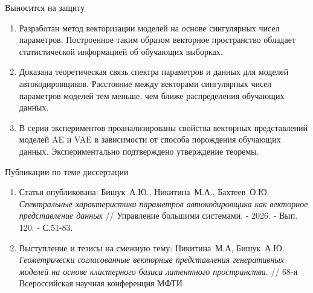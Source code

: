 \documentclass{beamer}
\begin{document}
\begin{frame}{Выносится на защиту}
\begin{enumerate}
    \item Разработан метод векторизации моделей на основе сингулярных чисел параметров. Построенное таким образом векторное пространство обладает статистической информацией об обучающих выборках.
    \item Доказана теоретическая связь спектра параметров и данных для моделей автокодировщиков. Расстояние между векторами сингулярных чисел параметров моделей тем меньше, чем ближе распределения обучающих данных.
    \item В серии экспериментов проанализированы свойства векторных представлений моделей AE и VAE в зависимости от способа порождения обучающих данных. Экспериментально подтверждено утверждение теоремы.
\end{enumerate}
\end{frame}
\begin{frame}{Публикации по теме диссертации}
\begin{enumerate}
    \item Статья опубликована:
Бишук~А.Ю., Никитина~М.А., Бахтеев~О.Ю. \textit{Спектральные характеристики параметров автокодировщика как векторное представление данных} // Управление большими системами. - 2026. - Вып. 120. - С.51-83.
    \item Выступление и тезисы на смежную тему: Никитина~М.А, Бишук~А.Ю. \textit{Геометрически согласованные векторные представления генеративных моделей на основе кластерного базиса латентного пространства}. // 68-я Всероссийская научная конференция МФТИ
\end{enumerate}
\end{frame}
\end{document}
